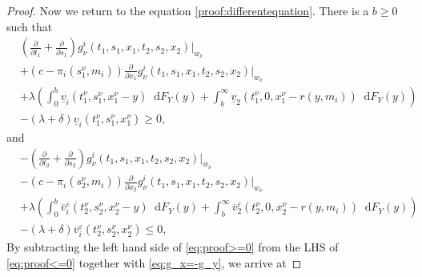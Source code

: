 \documentclass[a4paper]{scrartcl}
\theoremstyle{remark}
\theoremstyle{definition}
\numberwithin{equation}{section}
\newcommand*\diff{\mathop{}\!\mathrm{d}}
\begin{document}
\begin{proof}
    \noindent
    Now we return to the equation \eqref{proof:differentequation}. There is a $b\geq 0$ such that
    \begin{align}
    \label{eq:proof>=0}
        &\left(\frac{\partial}{\partial t_1}+\frac{\partial}{\partial s_1}\right) g_{\nu}^i(t_1,s_1,x_1,t_2,s_2,x_2)|_{w_{\nu}} \nonumber \\&+\left(c-\pi_i(s_1^\nu,m_i)\right)\frac{\partial}{\partial x_1}g_{\nu}^i(t_1,s_1,x_1,t_2,s_2,x_2)|_{w_{\nu}} \nonumber \\
    &+ \lambda \left(\int_{0}^{b}\underline{v}_i(t_1^\nu,s_1^\nu,x_1^\nu-y)\diff F_Y(y) \nonumber 
    +\int_{b}^{\infty}\underline{v}_2(t_1^\nu,0,x_1^\nu-r(y,m_i))\diff F_Y(y)\right) \\&- (\lambda+\delta) \underline{v}_i(t_1^\nu,s_1^\nu,x_1^\nu) \geq 0,
    \end{align}
    and 
    \begin{align}
    \label{eq:proof<=0}
        &-\left(\frac{\partial}{\partial t_2}+\frac{\partial}{\partial s_2}\right) g_{\nu}^i(t_1,s_1,x_1,t_2,s_2,x_2)|_{w_{\nu}}\\
        &-\left(c-\pi_i(s_2^\nu,m_i)\right)\frac{\partial}{\partial x_2}g_{\nu}^i(t_1,s_1,x_1,t_2,s_2,x_2)|_{w_{\nu}} \nonumber \\
    &+ \lambda \left(\int_{0}^{b}\overline{v}^\varepsilon_i(t_2^\nu,s_2^\nu,x_2^\nu-y)\diff F_Y(y) \nonumber 
    +\int_{b}^{\infty}\overline{v}^\varepsilon_2(t_2^\nu,0,x_2^\nu-r(y,m_i))\diff F_Y(y)\right) \\&- (\lambda+\delta) \overline{v}^\varepsilon_i(t_2^\nu,s_2^\nu,x_2^\nu) \leq 0,
    \end{align}
    By subtracting the left hand side of \eqref{eq:proof>=0} from the LHS of \eqref{eq:proof<=0} together with \eqref{eq:g_x=-g_y}, we arrive at
  

\end{proof}
\end{document}

